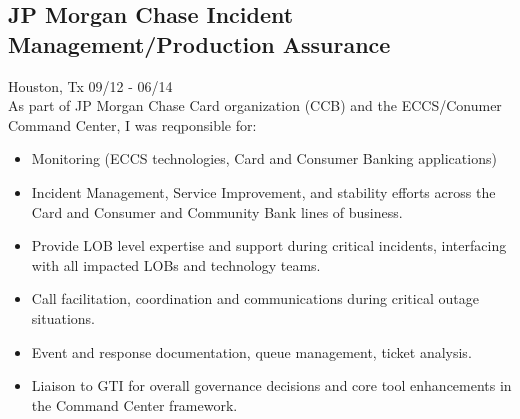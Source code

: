 \documentclass{article}
\begin{document}
  \subsection{JP Morgan Chase \hfill Incident Management/Production Assurance}
  Houston, Tx \hfill 09/12 - 06/14\\
  As part of JP Morgan Chase Card organization (CCB) and the ECCS/Conumer Command Center, I was reqponsible for:\\
  \begin{itemize}
  \item Monitoring (ECCS technologies, Card and Consumer Banking applications)
  \item Incident Management, Service Improvement, and stability efforts across the Card and Consumer and Community Bank lines of business.
  \item Provide LOB level expertise and support during critical incidents, interfacing with all impacted LOBs and technology teams.
  \item Call facilitation, coordination and communications during critical outage situations.
  \item Event and response documentation, queue management, ticket analysis.
  \item Liaison to GTI for overall governance decisions and core tool enhancements in the Command Center framework.
  \end{itemize}
\end{document}
